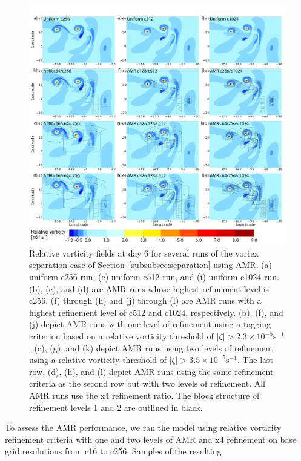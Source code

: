 \begin{figure}
    \centerline{%
    \noindent
    \includegraphics[width=\textwidth]{Chap1/new_lsplit_amr}}
    \caption{Relative vorticity fields at day 6 for several runs of the
    vortex separation case of
Section~\ref{subsubsec:separation}
using AMR.  (a) uniform c256 run, (e) uniform
    c512 run, and (i) uniform c1024 run.  (b), (c), and (d) are AMR runs
    whose highest refinement level is c256.  (f) through (h) and (j)
    through (l) are AMR runs with a highest refinement level of c512 and
    c1024, respectively.  (b), (f), and (j) depict AMR runs with one
    level of refinement using a tagging criterion based on a relative
    vorticity threshold of $|\zeta| > 2.3 \times 10^{-5} \mathrm{ s}^{-1}$.
    (c), (g), and (k) depict AMR runs using two levels of refinement
    using a relative-vorticity threshold of 
    $|\zeta| > 3.5 \times 10^{-5} \mathrm{ s}^{-1}$.  
    The last row, (d), (h), and (l) depict AMR
    runs using the same refinement criteria as the second row but with
    two levels of refinement.  All AMR runs use the x4 refinement
    ratio.  The block structure of refinement levels 1 and 2 are
    outlined in black.}%
    \label{fig:lsplit_amr}
\end{figure}
%
To assess the AMR performance, we ran the model using relative vorticity
refinement criteria with one and two levels of AMR and x4 refinement on
base grid resolutions from c16 to c256.  Samples of the resulting
